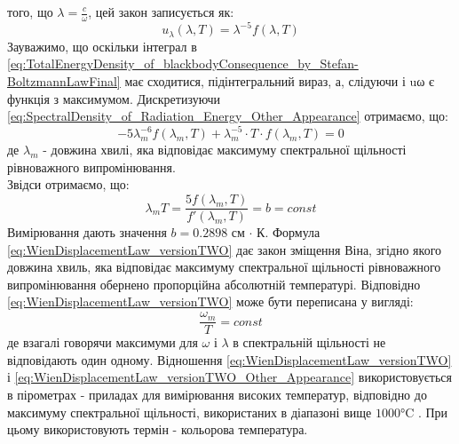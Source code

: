 \documentclass{article}
\begin{document}
того, що $\lambda = \frac{c}{\omega}$, цей закон записується як:
\begin{equation}
    \label{eq:SpectralDensity_of_Radiation_Energy_Other_Appearance}
    u_{\lambda}(\lambda, T) = \lambda^{-5} f(\lambda, T)
\end{equation}
Зауважимо, що оскільки інтеграл в \eqref{eq:TotalEnergyDensity_of_blackbodyConsequence_by_Stefan-BoltzmannLawFinal} має сходитися, підінтегральний вираз, а, слідуючи і uω є функція з максимумом. Дискретизуючи 
\eqref{eq:SpectralDensity_of_Radiation_Energy_Other_Appearance} отримаємо, що:
\begin{equation}
    \label{eq:SpectralDensity_of_Radiation_Energy_Other_Appearance_Discretized}
    -5 \lambda_{m}^{-6} f(\lambda_{m}, T) + \lambda_{m}^{-5} \cdot T \cdot f(\lambda_{m}, T) = 0 
\end{equation}
де $\lambda_{m}$ - довжина хвилі, яка відповідає максимуму спектральної щільності рівноважного випромінювання. \vspace{5mm} \\
Звідси отримаємо, що:
\begin{equation}
    \label{eq:WienDisplacementLaw_versionTWO}
    \lambda_{m} T = \frac{5 f(\lambda_{m}, T)}{f'(\lambda_{m}, T)} = b = const
\end{equation}
Вимірювання дають значення $b = 0.2898$ см $\cdot$ К. Формула \eqref{eq:WienDisplacementLaw_versionTWO} дає закон зміщення Віна, згідно якого довжина хвиль, яка відповідає максимуму спектральної щільності 
рівноважного випромінювання обернено пропорційна абсолютній температурі. Відповідно \eqref{eq:WienDisplacementLaw_versionTWO} може бути переписана у вигляді: 
\begin{equation}
    \label{eq:WienDisplacementLaw_versionTWO_Other_Appearance}
    \frac{\omega_{m}}{T} = const
\end{equation}
де взагалі говорячи максимуми для $\omega$ і $\lambda$ в спектральній щільності не відповідають один одному. Відношення \eqref{eq:WienDisplacementLaw_versionTWO} і \eqref{eq:WienDisplacementLaw_versionTWO_Other_Appearance} 
використовується в пірометрах - приладах для вимірювання високих температур, відповідно до максимуму спектральної щільності, використаних в діапазоні вище $1000\si{\celsius}$ . При цьому використовують термін - кольорова температура.
\end{document}
